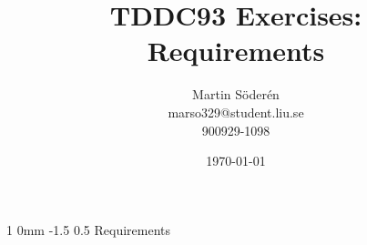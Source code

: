 \documentclass[a4paper,11pt]{article}
\makeatletter
\renewcommand{\section}{\@startsection
   {section}%
   {1}%
   {0mm}%
   {-1.5\baselineskip}%
   {0.5\baselineskip}%
   {\sffamily\bfseries\upshape\normalsize}}%
\makeatother
\begin{document}
\begin{titlepage}
\title{TDDC93 Exercises:\\
Requirements}
\author{Martin Söderén\\ marso329@student.liu.se\\900929-1098}
\date{\today}
\maketitle




\vfill %

\thispagestyle{empty}

\end{titlepage}
\section{Requirements}
\end{document}
